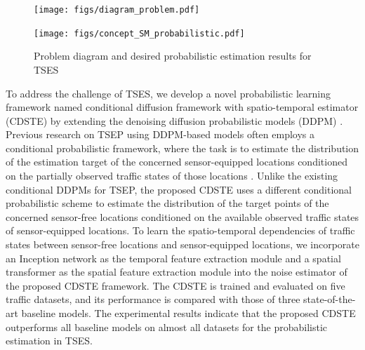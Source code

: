 \documentclass[a4paper,fleqn,12pt]{cas-sc}
\begin{document}
\begin{figure}[pos=htbp,width=13cm,align=\centering]
  \centering
  \colorbox{red!5}{
  \parbox{\linewidth}{
  \begin{minipage}{0.32\textwidth}
    \centering
    \texttt{[image: figs/diagram\_problem.pdf]}
  \end{minipage}\hfill
  \begin{minipage}{0.68\textwidth}
    \centering
    \texttt{[image: figs/concept\_SM\_probabilistic.pdf]}
  \end{minipage}
  \caption{Problem diagram and desired probabilistic estimation results for TSES}
  \label{fig:TSES_problem_diagram}
  }}
\end{figure}

To address the challenge of TSES, we develop a novel probabilistic learning framework named conditional diffusion framework with spatio-temporal estimator (CDSTE) by extending the denoising diffusion probabilistic models (DDPM) \citep{ho2020denoising}. Previous research on TSEP using DDPM-based models often employs a conditional probabilistic framework, where the task is to estimate the distribution of the estimation target of the concerned sensor-equipped locations conditioned on the partially observed traffic states of those locations \citep{rasul2021autoregressive,tashiro2021csdi}. Unlike the existing conditional DDPMs for TSEP, the proposed CDSTE uses a different conditional probabilistic scheme to estimate the distribution of the target points of the concerned sensor-free locations conditioned on the available observed traffic states of sensor-equipped locations. To learn the spatio-temporal dependencies of traffic states between sensor-free locations and sensor-equipped locations, we incorporate an Inception network \citep{wu2023timesnet} as the temporal feature extraction module and a spatial transformer \citep{xu2020spatial} as the spatial feature extraction module into the noise estimator of the proposed CDSTE framework. The CDSTE is trained and evaluated on five traffic datasets, and its performance is compared with those of three state-of-the-art baseline models. The experimental results indicate that the proposed CDSTE outperforms all baseline models on almost all datasets for the probabilistic estimation in TSES.
\end{document}
